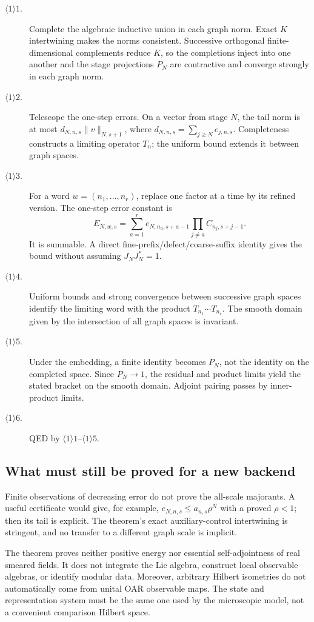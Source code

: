 \begin{description}
\item[$\langle1\rangle1$.] Complete the algebraic inductive union in
each graph norm. Exact $K$ intertwining makes the norms consistent.
Successive orthogonal finite-dimensional complements reduce $K$, so the
completions inject into one another and the stage projections $P_N$ are
contractive and converge strongly in each graph norm.
\item[$\langle1\rangle2$.] Telescope the one-step errors. On a vector
from stage $N$, the tail norm is at most
$d_{N,n,s}\|v\|_{N,s+1}$, where
$d_{N,n,s}=\sum_{j\ge N}e_{j,n,s}$. Completeness constructs a limiting
operator $T_n$; the uniform bound extends it between graph spaces.
\item[$\langle1\rangle3$.] For a word $w=(n_1,\ldots,n_r)$, replace
one factor at a time by its refined version. The one-step error constant is
\[
 E_{N,w,s}=\sum_{a=1}^r e_{N,n_a,s+a-1}
                  \prod_{j\ne a}C_{n_j,s+j-1}.
\]
It is summable. A direct fine-prefix/defect/coarse-suffix identity gives the
bound without assuming $J_NJ_N^*=1$.
\item[$\langle1\rangle4$.] Uniform bounds and strong convergence
between successive graph spaces identify the limiting word with the
product $T_{n_1}\cdots T_{n_r}$. The smooth domain given by the intersection
of all graph spaces is invariant.
\item[$\langle1\rangle5$.] Under the embedding, a finite identity
becomes $P_N$, not the identity on the completed space. Since $P_N\to1$,
the residual and product limits yield the stated bracket on the smooth
domain. Adjoint pairing passes by inner-product limits.
\item[$\langle1\rangle6$.] QED by $\langle1\rangle1$--$\langle1\rangle5$.
\end{description}

\subsection{What must still be proved for a new backend}

Finite observations of decreasing error do not prove the all-scale
majorants. A useful certificate would give, for example,
$e_{N,n,s}\le a_{n,s}\rho^N$ with a proved $\rho<1$; then its tail is
explicit. The theorem's exact auxiliary-control intertwining is stringent,
and no transfer to a different graph scale is implicit.

The theorem proves neither positive energy nor essential self-adjointness
of real smeared fields. It does not integrate the Lie algebra, construct
local observable algebras, or identify modular data. Moreover, arbitrary
Hilbert isometries do not automatically come from unital OAR observable maps.
The state and representation system must be the same one used by the
microscopic model, not a convenient comparison Hilbert space.

